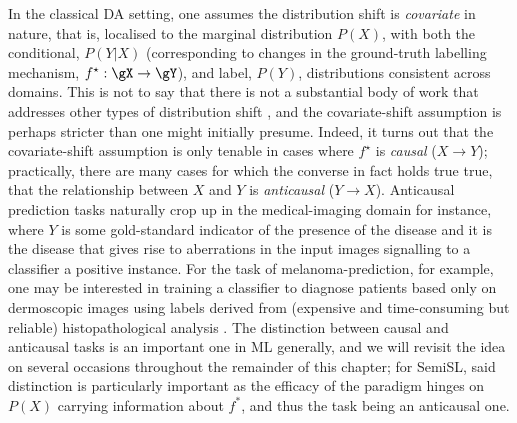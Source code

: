 %
In the classical DA setting, one assumes the distribution shift is \emph{covariate}
\citep{david2010impossibility} in nature, that is, localised to the marginal distribution \(P(X)\),
with both the conditional, \(P(Y|X)\) (corresponding to changes in the ground-truth labelling
mechanism, \( f^\star: \gX \to \gY \)), and label, \(P(Y)\), distributions consistent across
domains.
%
This is not to say that there is not a substantial body of work that addresses other types of
distribution shift \citep{zhao2019learning}, and the covariate-shift assumption is perhaps stricter
than one might initially presume.
%
Indeed, it turns out that the covariate-shift assumption is only tenable in cases where \(f^\star\)
is \emph{causal} (\(X \to Y\)); practically, there are many cases for which the converse in fact
holds true true, that the relationship between \(X\) and \(Y\) is \emph{anticausal} (\(Y \to X\)).
%
Anticausal prediction tasks naturally crop up in the medical-imaging domain for instance, where
\(Y\) is some gold-standard indicator of the presence of the disease and it is the disease that
gives rise to aberrations in the input images signalling to a classifier a positive instance. 
%
For the task of melanoma-prediction, for example, one may be interested in training a classifier to
diagnose patients based only on dermoscopic images using labels derived from (expensive and
time-consuming but reliable) histopathological analysis \citep{castro2020causality}.
%
The distinction between causal and anticausal tasks is an important one in ML generally, and we
will revisit the idea on several occasions throughout the remainder of this chapter; for SemiSL,
said distinction is particularly important as the efficacy of the paradigm hinges on \( P(X) \)
carrying information about \(f^\ast\), and thus the task being an anticausal one.
%
%
